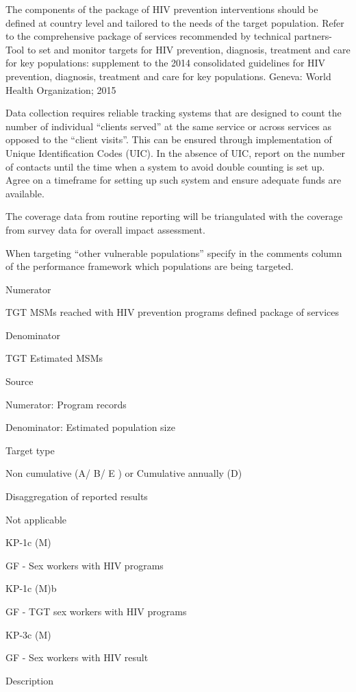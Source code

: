 \documentclass[]{book}
\begin{document}
The components of the package of HIV prevention interventions should be defined at country level and tailored to the needs of the target population. Refer to the comprehensive package of services recommended by technical partners-
Tool to set and monitor targets for HIV prevention, diagnosis, treatment and care for key populations: supplement to the 2014 consolidated guidelines for HIV prevention, diagnosis, treatment and care for key populations. Geneva:
World Health Organization; 2015

Data collection requires reliable tracking systems that are designed to count the number of individual ``clients served'' at the same service or across services as opposed to the ``client visits''. This can be ensured through implementation of Unique Identification Codes (UIC). In the absence of UIC, report on the number of contacts until the time when a system to avoid double counting is set up. Agree on a timeframe for setting up such system and ensure adequate funds are available.

The coverage data from routine reporting will be triangulated with the coverage from survey data for overall impact assessment.

When targeting ``other vulnerable populations'' specify in the comments column of the performance framework which populations are being targeted.

Numerator

TGT MSMs reached with HIV prevention programs defined package of services

Denominator

TGT Estimated MSMs

Source

Numerator: Program records

Denominator: Estimated population size

Target type

Non cumulative (A/ B/ E ) or Cumulative annually (D)

Disaggregation of reported results

Not applicable

KP-1c (M)

GF - Sex workers with HIV programs

KP-1c (M)b

GF - TGT sex workers with HIV programs

KP-3c (M)

GF - Sex workers with HIV result

Description
\end{document}
